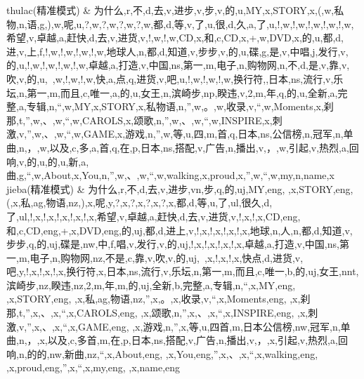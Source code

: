 \begin{center}
\begin{longtabu}
thulac\newline (精准模式) & 为什么,r,不,d,去,v,进步,v,步,v,的,u,MY,x,STORY,x,(,w,私物,n,语,g,),w,呢,u,?,w,?,w,?,w,?,w,都,d,等,v,了,u,很,d,久,a,了,u,!,w,!,w,!,w,!,w,!,w,希望,v,卓越,a,赶快,d,去,v,进货,v,!,w,!,w,CD,x,和,c,CD,x,+,w,DVD,x,的,u,都,d,进,v,上,f,!,w,!,w,!,w,!,w,地球人,n,都,d,知道,v,步步,v,的,u,碟,g,是,v,中唱,j,发行,v,的,u,!,w,!,w,!,w,!,w,卓越,a,打造,v,中国,ns,第一,m,电子,n,购物网,n,不,d,是,v,靠,v,吹,v,的,u,~,w,!,w,!,w,快,a,点,q,进货,v,吧,u,!,w,!,w,!,w,换行符,,日本,ns,流行,v,乐坛,n,第一,m,而且,c,唯一,a,的,u,女王,n,滨崎步,np,睽违,v,2,m,年,q,的,u,全新,a,完整,a,专辑,n,“,w,MY,x,STORY,x,私物语,n,”,w,。,w,收录,v,“,w,Moments,x,刹那,t,”,w,、,w,“,w,CAROLS,x,颂歌,n,”,w,、,w,“,w,INSPIRE,x,刺激,v,”,w,、,w,“,w,GAME,x,游戏,n,”,w,等,u,四,m,首,q,日本,ns,公信榜,n,冠军,n,单曲,n,，,w,以及,c,多,a,首,q,在,p,日本,ns,搭配,v,广告,n,播出,v,，,w,引起,v,热烈,a,回响,v,的,u,的,u,新,a,曲,g,“,w,About,x,You,n,”,w,、,w,“,w,walking,x,proud,x,”,w,“,w,my,n,name,x\\
jieba\newline (精准模式) & 为什么,r,不,d,去,v,进步,vn,步,q,的,uj,MY,eng, ,x,STORY,eng,(,x,私,ag,物语,nz,),x,呢,y,?,x,?,x,?,x,?,x,都,d,等,u,了,ul,很久,d,了,ul,!,x,!,x,!,x,!,x,!,x,希望,v,卓越,a,赶快,d,去,v,进货,v,!,x,!,x,CD,eng,和,c,CD,eng,+,x,DVD,eng,的,uj,都,d,进上,v,!,x,!,x,!,x,!,x,地球,n,人,n,都,d,知道,v,步步,q,的,uj,碟是,nw,中,f,唱,v,发行,v,的,uj,!,x,!,x,!,x,!,x,卓越,a,打造,v,中国,ns,第一,m,电子,n,购物网,nz,不是,c,靠,v,吹,v,的,uj,~,x,!,x,!,x,快点,d,进货,v,吧,y,!,x,!,x,!,x,换行符,x,日本,ns,流行,v,乐坛,n,第一,m,而且,c,唯一,b,的,uj,女王,nnt,滨崎步,nz,睽违,nz,2,m,年,m,的,uj,全新,b,完整,a,专辑,n,“,x,MY,eng, ,x,STORY,eng, ,x,私,ag,物语,nz,”,x,。,x,收录,v,“,x,Moments,eng, ,x,刹那,t,”,x,、,x,“,x,CAROLS,eng, ,x,颂歌,n,”,x,、,x,“,x,INSPIRE,eng, ,x,刺激,v,”,x,、,x,“,x,GAME,eng, ,x,游戏,n,”,x,等,u,四首,m,日本公信榜,nw,冠军,n,单曲,n,，,x,以及,c,多首,m,在,p,日本,ns,搭配,v,广告,n,播出,v,，,x,引起,v,热烈,a,回响,n,的的,nw,新曲,nz,“,x,About,eng, ,x,You,eng,”,x,、,x,“,x,walking,eng, ,x,proud,eng,”,x,“,x,my,eng, ,x,name,eng\\
\hline
\end{longtabu}
\end{center}



